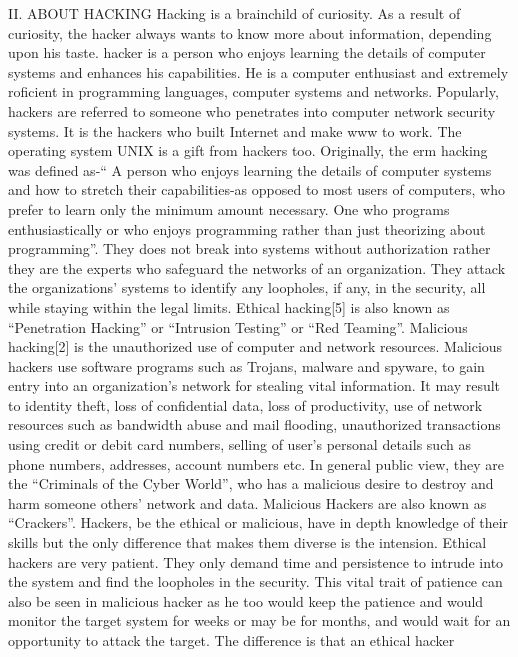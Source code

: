 II. ABOUT HACKING  
Hacking is a brainchild of curiosity. As a result of curiosity, the hacker always wants to know more about information, depending upon his taste.  hacker is a person who enjoys learning the details of computer systems and enhances his capabilities. He is a computer enthusiast and extremely roficient in programming languages, computer systems and networks. Popularly, hackers are referred to someone who penetrates into computer network security systems. It is the hackers who built Internet and make www to work. The operating system UNIX is a gift from hackers too. Originally, the erm hacking was defined as-“ A person who enjoys learning the details of computer systems and how to stretch their capabilities-as opposed to most users of 
computers, who prefer to learn only the minimum amount 
necessary. One who programs enthusiastically or who 
enjoys programming rather than just theorizing about 
programming”.  
They does not break into systems without authorization 
rather they are the experts who safeguard the networks of 
an organization. They attack the organizations’ systems to 
identify any loopholes, if any, in the security, all while 
staying within the legal limits. Ethical hacking[5] is also 
known as “Penetration Hacking” or “Intrusion Testing” or 
“Red Teaming”. Malicious hacking[2] is the unauthorized 
use of computer and network resources. Malicious hackers 
use software programs such as Trojans, malware and 
spyware, to gain entry into an organization’s network for 
stealing vital information. It may result to identity theft, 
loss of confidential data, loss of productivity, use of 
network resources such as bandwidth abuse and mail 
flooding, unauthorized transactions using credit or debit 
card numbers, selling of user’s personal details such as 
phone numbers, addresses, account numbers etc. In general 
public view, they are the “Criminals of the Cyber World”, 
who has a malicious desire to destroy and harm someone 
others’ network and data. Malicious Hackers are also 
known as “Crackers”. Hackers, be the ethical or malicious, 
have in depth knowledge of their skills but the only 
difference that makes them diverse is the intension.  
Ethical hackers are very patient. They only demand 
time and persistence to intrude into the system and find the 
loopholes in the security. This vital trait of patience can 
also be seen in malicious hacker as he too would keep the 
patience and would monitor the target system for weeks or 
may be for months, and would wait for an opportunity to 
attack the target. The difference is that an ethical hacker 
